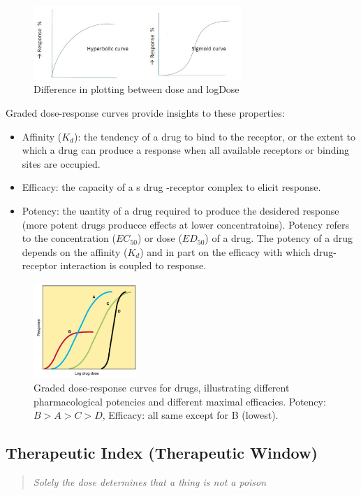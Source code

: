 \documentclass{book}
\begin{document}
\begin{figure}
    \includegraphics[width=0.7\textwidth, center]{images/image13.png}
    \caption{Difference in plotting between dose and logDose}
\end{figure}

Graded dose-response curves provide insights to these properties:

\begin{itemize}
    \item Affinity ($K_d$): the tendency of a drug to bind to the receptor, or the extent to which a drug can produce a response when all available receptors or binding sites are occupied. 
    \item Efficacy: the capacity of a s drug -receptor complex to elicit response.
    \item Potency:  the uantity of a drug required to produce the desidered response (more potent drugs producce effects at lower concentratoins). Potency refers to the concentration ($EC_{50}$) or dose ($ED_{50}$) of a drug. The potency of a drug depends on the affinity ($K_d$) and in part on the efficacy with which drug-receptor interaction is coupled to response.
\end{itemize}

\begin{figure}[H]
    \includegraphics[width=0.35\textwidth, center]{images/image14.png}
    \caption{Graded dose-response curves for drugs, illustrating different pharmacological potencies and different maximal efficacies. Potency: $B>A>C>D$, Efficacy: all same except for B (lowest).}
\end{figure}


\subsection{Therapeutic Index (Therapeutic Window)}
\begin{quotation}
    \textit{Solely the dose determines that a thing is not a poison}
\end{quotation}
\end{document}
